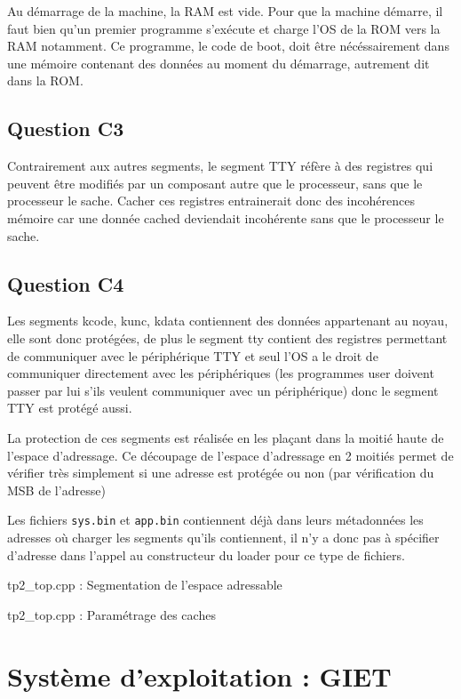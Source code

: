 \documentclass{article}
\begin{document}
Au démarrage de la machine, la RAM est vide. Pour que la machine démarre,
il faut bien qu'un premier programme s'exécute et charge l'OS de la ROM vers
la RAM notamment.
Ce programme, le code de boot, doit être nécéssairement dans une mémoire
contenant des données au moment du démarrage, autrement dit dans la ROM.

\subsection{Question C3}

Contrairement aux autres segments, le segment TTY réfère à des registres qui
peuvent être modifiés par un composant autre que le processeur, sans que le
processeur le sache.
Cacher ces registres entrainerait donc des incohérences mémoire car une
donnée cached deviendait incohérente sans que le processeur le sache.

\subsection{Question C4}

Les segments kcode, kunc, kdata contiennent des données appartenant au noyau,
elle sont donc protégées, de plus le segment tty contient des registres
permettant de communiquer avec le périphérique TTY et seul l'OS a le droit de
communiquer directement avec les périphériques (les programmes user doivent
passer par lui s'ils veulent communiquer avec un périphérique) donc le segment
TTY est protégé aussi.

La protection de ces segments est réalisée en les plaçant dans la moitié haute
de l'espace d'adressage. Ce découpage de l'espace d'adressage en 2 moitiés
permet de vérifier très simplement si une adresse est protégée ou non
(par vérification du MSB de l'adresse)

Les fichiers \texttt{sys.bin} et \texttt{app.bin} contiennent déjà dans leurs
métadonnées les adresses où charger les segments qu'ils contiennent,
il n'y a donc pas à spécifier d'adresse dans l'appel au constructeur
du loader pour ce type de fichiers.

\newpage
tp2\_top.cpp : Segmentation de l'espace adressable


tp2\_top.cpp : Paramétrage des caches 


\section{Système d'exploitation : GIET}
\end{document}
